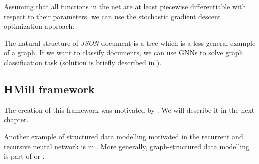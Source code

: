 Assuming that all functions in the net are at least piecewise differentiable with respect to their parameters, we can use the stochastic gradient descent optimization approach.

The natural structure of \emph{JSON} document is a tree which is a less general example of a graph. If we want to classify documents, we can use GNNs to solve graph classification task (solution is briefly described in \cite{Pevny2020}).

\subsection{HMill framework}
The creation of this framework was motivated by \cite{Pevny2016a}. We will describe it in the next chapter.

Another example of structured data modelling motivated in the recurrent and recursive neural network is in \cite{Woof2020}. More generally, graph-structured data modelling is part of \cite{Henaff2015} or \cite{Borgwardt2005}.




